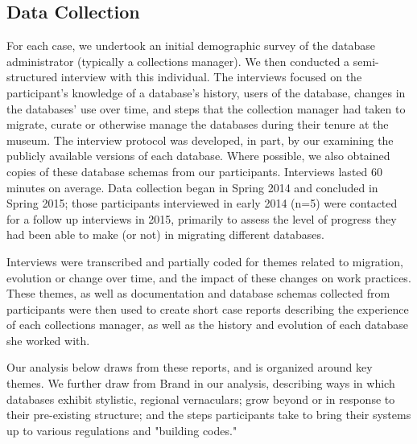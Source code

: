 \subsection{Data Collection}

For each case, we undertook an initial demographic survey of the database administrator (typically a collections manager). We then conducted a semi-structured interview with this individual. The interviews focused on the participant's knowledge of a database's history, users of the database, changes in the databases’ use over time, and steps that the collection manager had taken to migrate, curate or otherwise manage the databases during their tenure at the museum. The interview protocol was developed, in part, by our examining the publicly available versions of each database. Where possible, we also obtained copies of these database schemas from our participants. Interviews lasted 60 minutes on average. Data collection began in Spring 2014 and concluded in Spring 2015; those participants interviewed in early 2014 (n=5) were contacted for a follow up interviews in 2015, primarily to assess the level of progress they had been able to make (or not) in migrating different databases.

Interviews were transcribed and partially coded for themes related to migration, evolution or change over time, and the impact of these changes on work practices. These themes, as well as documentation and database schemas collected from participants were then used to create short case reports describing the experience of each collections manager, as well as the history and evolution of each database she worked with. 

Our analysis below draws from these reports, and is organized around key themes. We further draw from Brand in our analysis, describing ways in which databases exhibit stylistic, regional vernaculars; grow beyond or in response to their pre-existing structure; and the steps participants take to bring their systems up to various regulations and "building codes."\